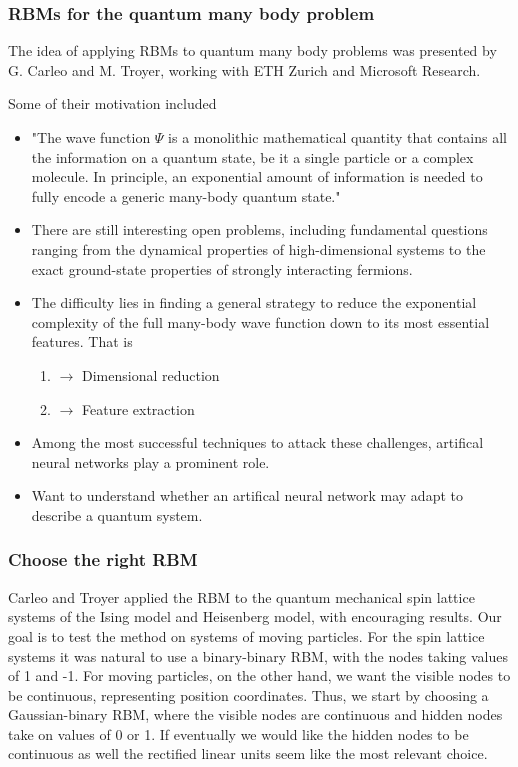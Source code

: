 \documentclass{beamer}
\begin{document}
\begin{frame}
\frametitle{RBMs for the quantum many body problem}

The idea of applying RBMs to quantum many body problems was presented by G. Carleo and M. Troyer, working with ETH Zurich and Microsoft Research.

Some of their motivation included

\begin{itemize}
\item "The wave function $\Psi$ is a monolithic mathematical quantity that contains all the information on a quantum state, be it a single particle or a complex molecule. In principle, an exponential amount of information is needed to fully encode a generic many-body quantum state."

\item There are still interesting open problems, including fundamental questions ranging from the dynamical properties of high-dimensional systems to the exact ground-state properties of strongly interacting fermions.

\item The difficulty lies in finding a general strategy to reduce the exponential complexity of the full many-body wave function down to its most essential features. That is
\begin{enumerate}

\item $\rightarrow$ Dimensional reduction

\item $\rightarrow$ Feature extraction

\end{enumerate}

\noindent
\item Among the most successful techniques to attack these challenges, artifical neural networks play a prominent role.

\item Want to understand whether an artifical neural network may adapt to describe a quantum system.
\end{itemize}

\noindent
\end{frame}

\begin{frame}
\frametitle{Choose the right RBM}

Carleo and Troyer applied the RBM to the quantum mechanical spin lattice systems of the Ising model and Heisenberg model, with encouraging results. Our goal is to test the method on systems of moving particles. For the spin lattice systems it was natural to use a binary-binary RBM, with the nodes taking values of 1 and -1. For moving particles, on the other hand, we want the visible nodes to be continuous, representing position coordinates. Thus, we start by choosing a Gaussian-binary RBM, where the visible nodes are continuous and hidden nodes take on values of 0 or 1. If eventually we would like the hidden nodes to be continuous as well the rectified linear units seem like the most relevant choice.
\end{frame}
\end{document}
